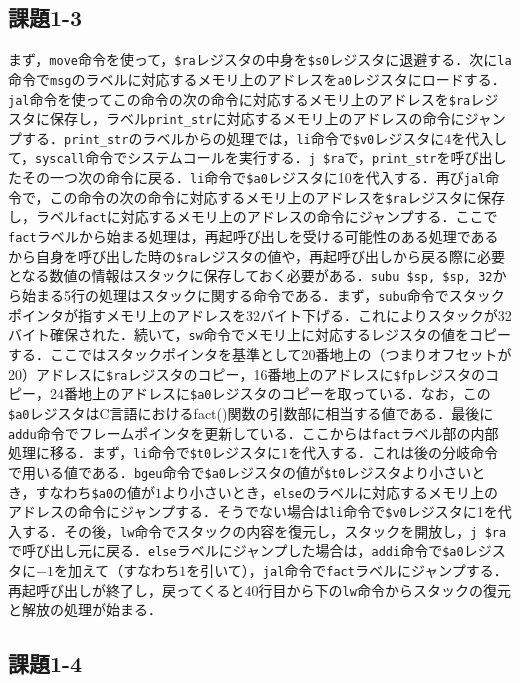 \subsection{課題1-3}
まず，\verb|move|命令を使って，\verb|$ra|レジスタの中身を\verb|$s0|レジスタに退避する．次に\verb|la|命令で\verb|msg|のラベルに対応するメモリ上のアドレスを\verb|a0|レジスタにロードする．\verb|jal|命令を使ってこの命令の次の命令に対応するメモリ上のアドレスを\verb|$ra|レジスタに保存し，ラベル\verb|print_str|に対応するメモリ上のアドレスの命令にジャンプする．\verb|print_str|のラベルからの処理では，\verb|li|命令で\verb|$v0|レジスタに$4$を代入して，\verb|syscall|命令でシステムコールを実行する．\verb|j $ra|で，\verb|print_str|を呼び出したその一つ次の命令に戻る．\verb|li|命令で\verb|$a0|レジスタに10を代入する．再び\verb|jal|命令で，この命令の次の命令に対応するメモリ上のアドレスを\verb|$ra|レジスタに保存し，ラベル\verb|fact|に対応するメモリ上のアドレスの命令にジャンプする．ここで\verb|fact|ラベルから始まる処理は，再起呼び出しを受ける可能性のある処理であるから自身を呼び出した時の\verb|$ra|レジスタの値や，再起呼び出しから戻る際に必要となる数値の情報はスタックに保存しておく必要がある．\verb|subu $sp, $sp, 32|から始まる5行の処理はスタックに関する命令である．まず，\verb|subu|命令でスタックポインタが指すメモリ上のアドレスを32バイト下げる．これによりスタックが32バイト確保された．続いて，\verb|sw|命令でメモリ上に対応するレジスタの値をコピーする．ここではスタックポインタを基準として20番地上の（つまりオフセットが20）アドレスに\verb|$ra|レジスタのコピー，16番地上のアドレスに\verb|$fp|レジスタのコピー，24番地上のアドレスに\verb|$a0|レジスタのコピーを取っている．なお，この\verb|$a0|レジスタはC言語におけるfact()関数の引数部に相当する値である．最後に\verb|addu|命令でフレームポインタを更新している．ここからは\verb|fact|ラベル部の内部処理に移る．まず，\verb|li|命令で\verb|$t0|レジスタに$1$を代入する．これは後の分岐命令で用いる値である．\verb|bgeu|命令で\verb|$a0|レジスタの値が\verb|$t0|レジスタより小さいとき，すなわち\verb|$a0|の値が$1$より小さいとき，\verb|else|のラベルに対応するメモリ上のアドレスの命令にジャンプする．そうでない場合は\verb|li|命令で\verb|$v0|レジスタに1を代入する．その後，\verb|lw|命令でスタックの内容を復元し，スタックを開放し，\verb|j $ra|で呼び出し元に戻る．\verb|else|ラベルにジャンプした場合は，\verb|addi|命令で\verb|$a0|レジスタに$-1$を加えて（すなわち$1$を引いて），\verb|jal|命令で\verb|fact|ラベルにジャンプする．再起呼び出しが終了し，戻ってくると40行目から下の\verb|lw|命令からスタックの復元と解放の処理が始まる．

\subsection{課題1-4}


